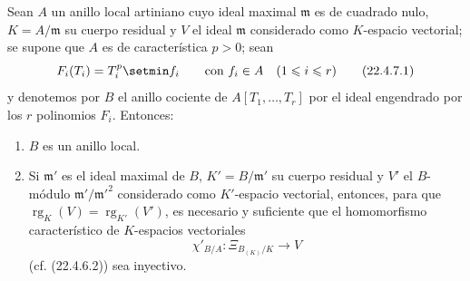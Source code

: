 \begin{proposition}[22.4.7]
\label{0.22.4.7-fr}
Sean $A$ un anillo local artiniano cuyo ideal maximal $\mathfrak m$ es de
cuadrado nulo, $K=A/\mathfrak m$ su cuerpo residual y $V$ el ideal $\mathfrak m$
considerado como $K$-espacio vectorial; se supone que $A$ es de
característica $p>0$; sean
\begin{equation}
\label{0.22.4.7.1-fr}
  F_i(T_i)=T_i^p\setmin f_i\qquad\text{con }f_i\in A\quad(1\leqslant i\leqslant r)
  \tag{22.4.7.1}
\end{equation}
y denotemos por $B$ el anillo cociente de $A[T_1,\ldots,T_r]$ por el ideal
engendrado por los $r$ polinomios $F_i$. Entonces:
\begin{enumerate}
  \item[\rm(i)] $B$ es un anillo local.
  \item[\rm(ii)] Si $\mathfrak m'$ es el ideal maximal de $B$,
  $K'=B/\mathfrak m'$ su cuerpo residual y $V'$ el $B$-módulo
  $\mathfrak m'/\mathfrak m'^2$ considerado como $K'$-espacio vectorial, entonces,
  para que $\operatorname{rg}_K(V)=\operatorname{rg}_{K'}(V')$, es necesario y suficiente que el homomorfismo
  característico de $K$-espacios vectoriales
  \begin{equation}
  \label{0.22.4.7.2-fr}
    \chi'_{B/A}:\Xi_{B_{(K)}/K}\longrightarrow V
    \tag{22.4.7.2}
  \end{equation}
  \textup{(cf. (22.4.6.2))} sea inyectivo.
\end{enumerate}
\end{proposition}

